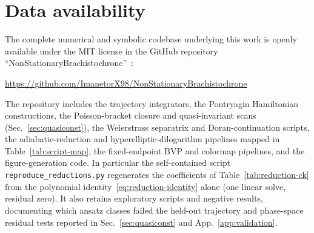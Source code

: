 \documentclass[
    aps, prd, twocolumn, superscriptaddress,
    showpacs, nofootinbib, floatfix
]{revtex4-2}
\begin{document}
\section*{Data availability}
The complete numerical and symbolic codebase underlying this work is openly
available under the MIT license in the GitHub repository
``NonStationary\-Brachi\-sto\-chrone''~\cite{Rosignoli2026Code}:
\begin{center}
\url{https://github.com/ImanetorX98/NonStationaryBrachistochrone}
\end{center}
The repository includes the trajectory integrators, the Pontryagin Hamiltonian
constructions, the Poisson-bracket closure and quasi-invariant scans
(Sec.~\ref{sec:quasiconst}), the Weierstrass separatrix and Doran-continuation
scripts, the adiabatic-reduction and hyperelliptic-dilogarithm pipelines mapped in
Table~\ref{tab:script-map}, the fixed-endpoint BVP and colormap pipelines, and the
figure-generation code. In particular the self-contained script
\texttt{reproduce\_reductions.py} regenerates the coefficients of
Table~\ref{tab:reduction-ck} from the polynomial
identity~\eqref{eq:reduction-identity} alone (one linear solve, residual zero). It
also retains exploratory scripts and negative results,
documenting which ansatz classes failed the held-out trajectory and phase-space
residual tests reported in Sec.~\ref{sec:quasiconst} and
App.~\ref{app:validation}.

\clearpage


\end{document}
